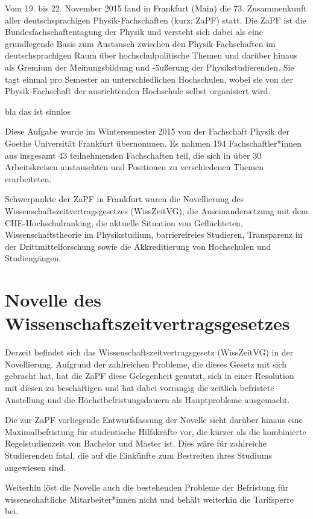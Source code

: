Vom 19. bis 22. November 2015 fand in Frankfurt (Main) die 73. Zusammenkunft
aller deutschsprachigen Physik-Fachschaften (kurz: ZaPF) statt.  Die ZaPF ist
die Bundesfachschaftentagung der Physik und versteht sich dabei als eine
grundlegende Basis zum Austausch zwischen den Physik-Fachschaften im
deutschsprachigen Raum über hochschulpolitische Themen und darüber hinaus als
Gremium der Meinungsbildung und -äußerung der Physikstudierenden. Sie tagt
einmal pro Semester an unterschiedlichen Hochschulen, wobei sie von der
Physik-Fachschaft der ausrichtenden Hochschule selbst organisiert wird.

bla das ist sinnlos

Diese Aufgabe wurde im Wintersemester 2015 von der Fachschaft Physik der Goethe
Universität Frankfurt übernommen. Es nahmen 194 Fachschaftler*innen aus
insgesamt 43 teilnehmenden Fachschaften teil, die sich in über 30 Arbeitskreisen
austauschten und Positionen zu verschiedenen Themen erarbeiteten.

Schwerpunkte der ZaPF in Frankfurt waren die Novellierung des
Wissenschaftszeitvertragsgesetzes (WissZeitVG), die Auseinandersetzung mit dem
CHE-Hochschulranking, die aktuelle Situation von Geflüchteten,
Wissenschaftstheorie im Physikstudium, barrierefreies Studieren, Transparenz in
der Drittmittelforschung sowie die Akkreditierung von Hochschulen und
Studiengängen.

\newpage

\section*{Novelle des Wissenschaftszeitvertragsgesetzes}
Derzeit befindet sich das Wissenschaftszeitvertragsgesetz (WissZeitVG) in der
Novellierung. Aufgrund der zahlreichen Probleme, die dieses Gesetz mit sich
gebracht hat, hat die ZaPF diese Gelegenheit genutzt, sich in einer Resolution
mit diesen zu beschäftigen und hat dabei  vorrangig die zeitlich befristete
Anstellung und die Höchstbefristungsdauern als Hauptprobleme ausgemacht.

Die zur ZaPF vorliegende Entwurfsfassung der Novelle sieht darüber hinaus eine
Maximalbefristung für studentische Hilfskräfte vor, die kürzer als die
kombinierte Regelstudienzeit von Bachelor und Master ist. Dies wäre für
zahlreiche Studierenden fatal, die auf die Einkünfte zum Bestreiten ihres
Studiums angewiesen sind.

Weiterhin löst die Novelle auch die bestehenden Probleme der Befristung für
wissenschaftliche Mitarbeiter*innen nicht und behält weiterhin die Tarifsperre bei.

